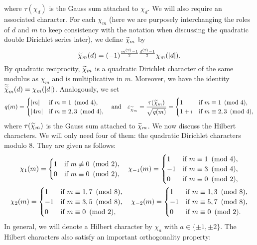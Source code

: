     where $\tau(\chi_{d})$ is the Gauss sum attached to $\chi_{d}$. We will also require an associated character. For each $\chi_{m}$ (here we are purposely interchanging the roles of $d$ and $m$ to keep consistency with the notation when discussing the quadratic double Dirichlet series later), we define $\widetilde{\chi}_{m}$ by
    \[
        \widetilde{\chi}_{m}(d) = (-1)^{\frac{m^{(2)}-1}{2}\frac{d^{(2)}-1}{2}}\chi_{m}(|d|).
    \]
    By quadratic reciprocity, $\widetilde{\chi}_{m}$ is a quadratic Dirichlet character of the same modulus as $\chi_{m}$ and is multiplicative in $m$. Moreover, we have the identity $\widetilde{\widetilde{\chi}}_{m}(d) = \chi_{m}(|d|)$. Analogously, we set
    \[
        q(m) = \begin{cases} |m| & \text{if $m \equiv 1 \ \left(\text{mod }4\right)$}, \\ |4m| & \text{if $m \equiv 2,3 \ \left(\text{mod }4\right)$}, \end{cases} \quad \text{and} \quad \varepsilon_{\widetilde{\chi}_{m}} = \frac{\tau(\widetilde{\chi}_{m})}{\sqrt{q(m)}} = \begin{cases} 1 & \text{if $m \equiv 1 \ \left(\text{mod }4\right)$}, \\ 1+i & \text{if $m \equiv 2,3 \ \left(\text{mod }4\right)$}, \end{cases}
    \]
    where $\tau(\widetilde{\chi}_{m})$ is the Gauss sum attached to $\widetilde{\chi}_{m}$. We now discuss the Hilbert characters. We will only need four of them: the quadratic Dirichlet characters modulo $8$. They are given as follows:
    \begin{gather*}
        \chi_{1}(m) = \begin{cases} 1 &\text{if $m \not\equiv 0 \ \left(\text{mod }2\right)$}, \\ 0 &\text{if $m \equiv 0 \ \left(\text{mod }2\right)$}, \end{cases} \quad \chi_{-1}(m) = \begin{cases} 1 &\text{if $m \equiv 1 \ \left(\text{mod }4\right)$}, \\ -1 &\text{if $m \equiv 3 \ \left(\text{mod }4\right)$}, \\ 0 &\text{if $m \equiv 0 \ \left(\text{mod }2\right)$}, \end{cases} \\ \chi_{2}(m) = \begin{cases} 1 &\text{if $m \equiv 1,7 \ \left(\text{mod }8\right)$}, \\ -1 &\text{if $m \equiv 3,5 \ \left(\text{mod }8\right)$}, \\ 0 &\text{if $m \equiv 0 \ \left(\text{mod }2\right)$}, \end{cases} \quad \chi_{-2}(m) = \begin{cases} 1 &\text{if $m \equiv 1,3 \ \left(\text{mod }8\right)$}, \\ -1 &\text{if $m \equiv 5,7 \ \left(\text{mod }8\right)$}, \\ 0 &\text{if $m \equiv 0 \ \left(\text{mod }2\right)$}. \end{cases}
    \end{gather*}
    In general, we will denote a Hilbert character by $\chi_{a}$ with $a \in \{\pm1,\pm2\}$. The Hilbert characters also satisfy an important orthogonality property:

